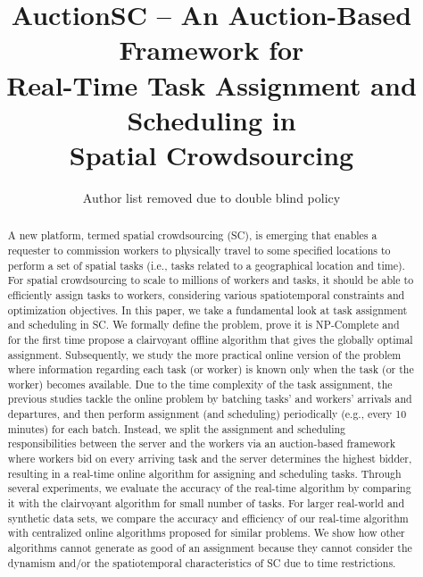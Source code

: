 \documentclass{sig-alternate}
\title{AuctionSC -- An Auction-Based Framework for\\ Real-Time Task Assignment and Scheduling in\\ Spatial Crowdsourcing}
\begin{document}
\sloppy

\author{Author list removed due to double blind policy}

\maketitle
\begin{abstract}
A new platform, termed spatial crowdsourcing (SC), is emerging that enables a requester to commission workers to physically travel to some specified locations to perform a set of spatial tasks (i.e., tasks related to a geographical location and time).  For spatial crowdsourcing to scale to millions of workers and tasks, it should be able to efficiently assign tasks to workers, considering various spatiotemporal constraints and optimization objectives. In this paper, we take a fundamental look at task assignment and scheduling in SC. We formally define the problem, prove it is NP-Complete and for the first time propose a clairvoyant offline algorithm that gives the globally optimal assignment. Subsequently, we study the more practical online version of the problem where information regarding each task (or worker) is known only when the task (or the worker) becomes available. Due to the time complexity of the task assignment, the previous studies tackle the online problem by batching tasks' and workers' arrivals and departures, and then perform assignment (and scheduling) periodically (e.g., every 10 minutes) for each batch. Instead, we split the assignment and scheduling responsibilities between the server and the workers via an auction-based framework where workers bid on every arriving task and the server determines the highest bidder, resulting in a real-time online algorithm for assigning and scheduling tasks. Through several experiments, we evaluate the accuracy of the real-time algorithm by comparing it with the clairvoyant algorithm for small number of tasks. For larger real-world and synthetic data sets, we compare the accuracy and efficiency of our real-time algorithm with centralized online algorithms proposed for similar problems. We show how other algorithms cannot generate as good of an assignment because they cannot consider the dynamism and/or the spatiotemporal characteristics of SC due to time restrictions.

\end{abstract}
\end{document}
